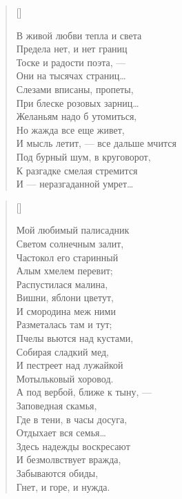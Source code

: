


\settowidth{\versewidth}{В живой любви тепла и света}
\begin{verse}[\versewidth]
\begin{altverse}
В живой любви тепла и света\\
Предела нет, и нет границ\\
Тоске и радости поэта, --- \\
Они на тысячах страниц\ldots\\
Слезами вписаны, пропеты, \\
При блеске розовых зарниц\ldots\\
Желаньям надо б утомиться,\\
Но жажда все еще живет,\\
И мысль летит, --- все дальше мчится\\
Под бурный шум, в круговорот,\\
К разгадке смелая стремится\\
И --- неразгаданной умрет\ldots
\end{altverse}
\end{verse}


\newpage

\settowidth{\versewidth}{Мой любимый полисадник}
\begin{verse}[\versewidth]
\begin{altverse}
Мой любимый палисадник\\
Светом солнечным залит,\\
Частокол его старинный\\
Алым хмелем перевит;\\
Распустилася малина,\\
Вишни, яблони цветут,\\
И смородина меж ними\\
Разметалась там и тут;\\
Пчелы вьются над кустами,\\
Собирая сладкий мед,\\
И пестреет над лужайкой\\
Мотыльковый хоровод.\\
А под вербой, ближе к тыну, ---\\
Заповедная скамья,\\
Где в тени, в часы досуга,\\
Отдыхает вся семья\ldots\\
Здесь надежды воскресают\\
И безмолвствует вражда,\\
Забываются обиды,\\
Гнет, и горе, и нужда.
\end{altverse}
\end{verse}

